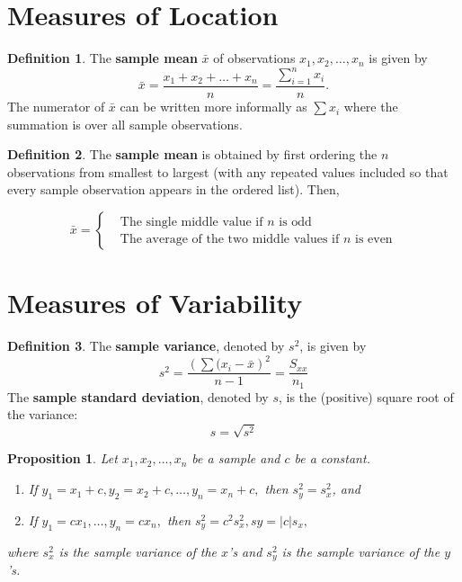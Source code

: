 \documentclass[a4paper]{report}
\theoremstyle{definition}
\newtheorem{definition}{Definition}
\theoremstyle{plain}
\newtheorem{prop}{Proposition}
\begin{document}
\section{Measures of Location}

\begin{definition}
  The \textbf{sample mean} $\bar{x}$ of observations $x_1, x_2, \dots, x_n$ is given by
  \begin{equation}
    \bar{x} = \frac{x_1 + x_2 + \hdots + x_n}{n} = \frac{\sum\limits_{i=1}^n x_i}{n}.
  \end{equation}
  The numerator of $\bar{x}$ can be written more informally as $\sum\nolimits
  x_i$ where the summation is over all sample observations.
\end{definition}

\begin{definition}
  The \textbf{sample mean} is obtained by first ordering the $n$ observations
  from smallest to largest (with any repeated values included so that every
  sample observation appears in the ordered list). Then, 
  
  \[
    \bar{x} = \begin{cases}
      {} & \text{The single middle value if $n$ is odd} \\
      {} & \text{The average of the two middle values if $n$ is even}
    \end{cases}
  \]
\end{definition}

\section{Measures of Variability}

\begin{definition}
  The \textbf{sample variance}, denoted by $s^2$, is given by
  \begin{equation*}
    s^2 = \frac{\left(\sum\nolimits(x_i - \bar{x}\right)^2}{n-1} = \frac{S_{xx}}{n_1}
  \end{equation*}
  The \textbf{sample standard deviation}, denoted by $s$, is the (positive)
  square root of the variance:
  \begin{equation*}
    s = \sqrt{s^2}
  \end{equation*}
\end{definition}

\begin{prop}
  Let $x_1, x_2, \dots, x_n$ be a sample and $c$ be a constant.

  \begin{enumerate}
    \item If $y_1 = x_1 + c, y_2 = x_2 + c, \dots, y_n = x_n + c, $ then $s_y^2 = s_x^2$, and
    \item If $y_1 = cx_1, \dots, y_n = cx_n, $ then $s_y^2 = c^2s_x^2, sy = |c|s_x, $
  \end{enumerate}
  where $s_x^2$ is the sample variance of the $x$'s and $s_y^2$ is the sample
  variance of the $y$'s.
\end{prop}
\end{document}
